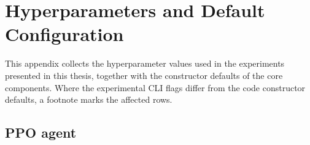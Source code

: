 
\chapter{Hyperparameters and Default Configuration}\label{app:hyperparameters}

This appendix collects the hyperparameter values used in the experiments presented in this
thesis, together with the constructor defaults of the core components. Where the experimental
CLI flags differ from the code constructor defaults, a footnote marks the affected rows.

\section{PPO agent}\label{app:hp-ppo}

